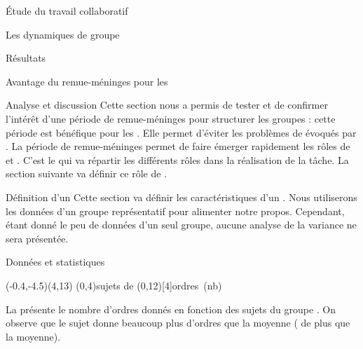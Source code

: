 \documentclass[myfrancais]{mythesis}
\begin{document}
\begin{mypart}{Étude du travail collaboratif}
\begin{mychapter}{Les dynamiques de groupe}
\begin{mysection}{Résultats}
\begin{mysubsection}{Avantage du remue-méninges pour les }
\begin{mysubsubsection}{Analyse et discussion}
						Cette section nous a permis de tester et de confirmer l'intérêt d'une période de remue-méninges pour structurer les groupes : cette période est bénéfique pour les .
						Elle permet d'éviter les problèmes de  évoqués par .
						La période de remue-méninges permet de faire émerger rapidement les rôles de  et .
						C'est le  qui va répartir les différents rôles dans la réalisation de la tâche.
						La section suivante va définir ce rôle de .
					\end{mysubsubsection}
				\end{mysubsection}
				\begin{mysubsection}{Définition d'un }
					Cette section va définir les caractéristiques d'un .
					Nous utiliserons les données d'un groupe représentatif pour alimenter notre propos.
					Cependant, étant donné le peu de données d'un seul groupe, aucune analyse de la variance ne sera présentée.

					\begin{mysubsubsection}{Données et statistiques}
						\begin{myfigure}
							\begin{myps}(-0.4,-4.5)(4,13)
								\myaxes(0,4){sujets de }(0,12)[4]{ordres~(nb)}
							\end{myps}
						\end{myfigure}

						La  présente le nombre d'ordres donnés  en fonction des sujets du groupe .
						On observe que le sujet  donne beaucoup plus d'ordres que la moyenne ( de plus que la moyenne).


\end{mysubsubsection}
\end{mysubsection}
\end{mysection}
\end{mychapter}
\end{mypart}
\end{document}
